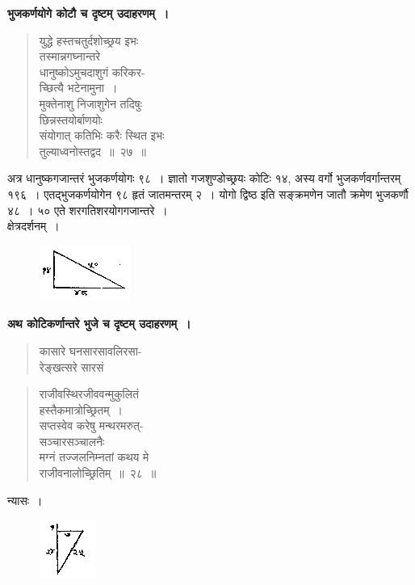 \documentclass[11pt, openany]{book}
\begin{document}
 \textbf{भुजकर्णयोगे कोटौ च दृष्टम् उदाहरणम्~।} 
\begin{quote}
\bqt
 युद्धे हस्तचतुर्दशोच्छ्रय इभः \\
 तस्मान्नगघ्नान्तरे \\
 धानुष्कोऽमुचदाशुगं करिकर-\\
 च्छित्यै भटेनामुना~।\\
मुक्तेनाशु निजाशुगेन तदिषुः \\
छिन्नस्तयोर्बाणयोः \\
संयोगात् कतिभिः करैः स्थित इभः \\
तुल्याध्वनोस्तद्वद~॥~२७~॥
\end{quote}
 
 अत्र धानुष्कगजान्तरं भुजकर्णयोगः ९८~। ज्ञातो गजशुण्डोच्छ्रयः कोटिः १४, अस्य वर्गो भुजकर्णवर्गान्तरम् १९६~। एतद्भुजकर्णयोगेन ९८ हृतं जातमन्तरम् २~। योगो द्विष्ठ इति सङ्क्रमणेन जातौ क्रमेण भुजकर्णौ ४८~। ५० एते शरगतिशरयोगगजान्तरे~। \\
 
\vspace{-4mm}
क्षेत्रदर्शनम्~। 

\begin{figure}[h!]
    \centering
    \includegraphics[scale=0.85]{graphics/capture35.png}
\end{figure}

 \textbf{अथ कोटिकर्णान्तरे भुजे च दृष्टम् उदाहरणम्~।} 
 \begin{quote}
     \bqt 
 कासारे घनसारसावलिरसा-\\
 रेङ्खत्सरे सारसं
 \end{quote}
\newpage
 \begin{quote}
     \bqt 
 राजीवस्थिरजीववन्मुकुलितं \\
 हस्तैकमात्रोच्छ्रितम्~।\\
सप्तस्वेव करेषु मन्थरमरुत्-\\
सञ्चारसञ्चालनैः \\
मग्नं तज्जलनिम्नतां कथय मे \\
राजीवनालोच्छ्रितिम्~॥~२८~॥
 \end{quote}

 न्यासः~। 
\begin{figure}[h!]
    \centering
    \includegraphics[scale=0.85]{graphics/capture36.png}
\end{figure}
\end{document}
